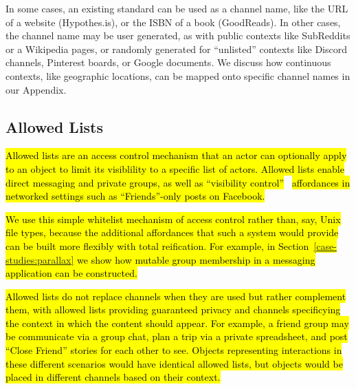 In some cases, an existing standard can be used as a channel
name, like the URL of a website (Hypothes.is),
or the ISBN of a book (GoodReads).
In other cases, the channel name may be user generated,
as with public contexts like SubReddits or a Wikipedia pages,
or randomly generated for ``unlisted'' contexts like
Discord channels, Pinterest boards, or Google documents.
We discuss how continuous contexts, like geographic locations, can be
mapped onto specific channel names in our Appendix.





\subsection{Allowed Lists}
\label{concepts:allowed-lists}

\hl{%
Allowed lists are an access control mechanism
that an actor can optionally apply to an object
to limit its visiblility to a specific list of actors.
Allowed lists enable direct messaging and private groups,
as well as ``visibility control''}~\cite{visibilitycontrol, toogayforfacebook}
\hl{affordances in networked settings such as
``Friends''-only posts on Facebook.
}%

\hl{%
We use this simple whitelist mechanism of access control rather than,
say, Unix file types, because the additional affordances that
such a system would provide can be built more flexibly with total reification.
For example, in Section~{\ref{case-studies:parallax}} we show how mutable group
membership in a messaging application can be constructed.
}%

\hl{%
Allowed lists do not replace channels when they are used
but rather complement them,
with allowed lists providing guaranteed privacy
and channels specificying the context in which the content should appear.
For example, a friend group may be communicate via a group chat,
plan a trip via a private spreadsheet, and post ``Close Friend'' stories
for each other to see.
Objects representing interactions in these different scenarios
would have identical allowed lists,
but objects would be placed in different channels based on their context.
}%
